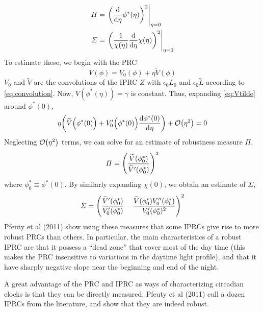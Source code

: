 \begin{equation}
\begin{aligned}
\varPi &=\eval{\qty(\dv{\eta} \phi^{*}(\eta) )^{2}}_{\eta=0}
\\
\varSigma &=\eval{\qty(\frac{1}{\chi(\eta)}
\dv{\eta} \chi(\eta) )^{2}}_{\eta=0}
\end{aligned}
\end{equation}
To estimate these, we begin with the PRC
\begin{equation}\label{eq:Vtilde}
V(\phi)=V_{0}(\phi)
+\eta\widetilde{V}(\phi)
\end{equation}
$V_{0}$ and $\widetilde{V}$ are the convolutions of the IPRC 
$Z$ with $\epsilon_{0}L_{0}$ and 
$\epsilon_{0}\widetilde{L}$ according to \eqref{eq:convolution}. Now, 
$V({\phi}^{*}(\eta))=\gamma$ is constant. Thus, expanding
\eqref{eq:Vtilde} around $\phi^{*}(0)$, 
\begin{equation}
\eta \qty(\widetilde{V}\Big(\phi^{*}(0)\Big)
+{V}_{0}'\Big(\phi^*(0)\Big)\dv{\phi^{*}(0)}{\eta})
+\order{\eta^2} = 0
\end{equation}
Neglecting $\order{\eta^2}$ terms, we can solve for an estimate of
robustness measure $\varPi$,
\begin{equation}
\varPi=\qty(
\frac{\widetilde{V}(\phi_{0}^{*})}
{\widetilde{V}'(\phi_{0}^{*})}
)^{2}
\end{equation}
where $\phi_{0}^{*}\equiv\phi^{*}(0)$. By similarly
expanding $\chi(0)$, we obtain an estimate of $\varSigma$,
\begin{equation}
\varSigma =\qty(
\frac{\widetilde{V}'(\phi_0^{*})}
{V_0'(\phi_0^{*})}
-\frac{\widetilde{V}(\phi_0^{*}){V}_0''(\phi_0^{*})}
{V_0'(\phi_0^{*})^{2}}
)^{2}
\end{equation}
Pfeuty et al (2011) show using these measures that some IPRCs give
rise to more robust PRCs than others. In particular, the main
characteristics of a robust IPRC are that it possess a “dead zone”
that cover most of the day time (this makes the PRC insensitive to
variations in the daytime light profile), and that it have sharply
negative slope near the beginning and end of the night. 

A great advantage of the PRC and IPRC as ways of characterizing
circadian clocks is that they can be directly measured. Pfeuty et al
(2011) cull a dozen IPRCs from the literature, and show that they are
indeed robust. 






















